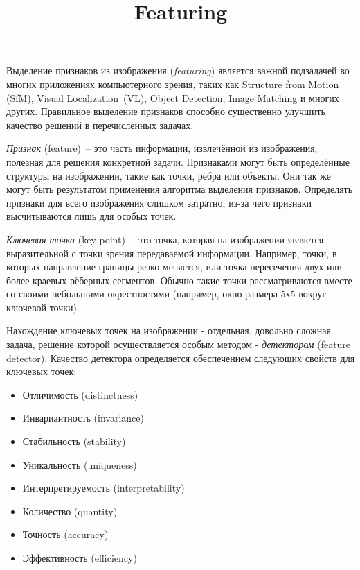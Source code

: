 \documentclass[a4paper]{article}
\begin{document}


\title{Featuring}


\maketitle

\norec{}


 Выделение признаков из изображения (\textit{featuring}) является важной подзадачей во многих приложениях компьютерного зрения, таких как Structure from Motion (SfM), Visual Localization~(VL), Object Detection, Image Matching и многих других. Правильное выделение признаков способно существенно улучшить качество решений в перечисленных задачах.


\textit{Признак} (feature)~-- это часть информации, извлечённой из изображения, полезная для решения конкретной задачи. Признаками могут быть определённые структуры на изображении, такие как точки, рёбра или объекты. Они так же могут быть результатом применения алгоритма выделения признаков. Определять признаки для всего изображения слишком затратно, из-за чего признаки высчитываются лишь для особых точек.


\textit{Ключевая точка} (key point)~-- это точка, которая на изображении является выразительной с точки зрения передаваемой информации. Например, точки, в которых направление границы резко меняется, или точка пересечения двух или более краевых рёберных сегментов. Обычно такие точки рассматриваются вместе со своими небольшими окрестностями (например, окно размера 5х5 вокруг ключевой точки).


Нахождение ключевых точек на изображении - отдельная, довольно сложная задача, решение которой осуществляется особым методом - \textit{детектором} (feature detector). Качество детектора определяется обеспечением следующих свойств для ключевых точек: 
\begin{itemize}
\item Отличимость (distinctness)
\item Инвариантность (invariance)
\item Стабильность (stability)
\item Уникальность (uniqueness) 
\item Интерпретируемость (interpretability)
\item Количество (quantity) 
\item Точность (accuracy)
\item Эффективность (efficiency) 
\end{itemize}
\end{document}
